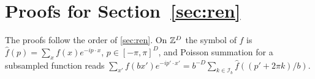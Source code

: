 \section{Proofs for \texorpdfstring{Section~\ref{sec:ren}}{renormalization}}\label{app:ren}

The proofs follow the order of \cref{sec:ren}. On $\mathbb{Z}^D$ the symbol of $f$ is $\hat f(p)=\sum_xf(x)e^{-ip\cdot x}$, $p\in[-\pi,\pi]^D$, and Poisson summation for a subsampled function reads $\sum_{x'}f(bx')e^{-ip'\cdot x'}=b^{-D}\sum_{k\in\mathcal I_b}\hat f((p'+2\pi k)/b)$.

